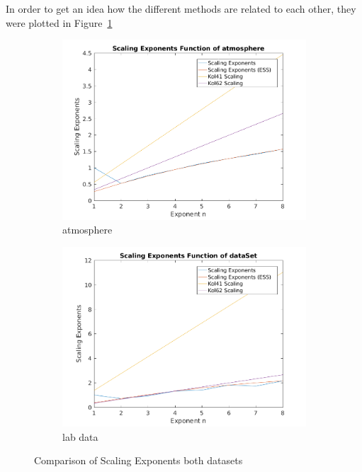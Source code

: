 \documentclass[12pt]{article}
\begin{document}
In order to get an idea how the different methods are related to each other, they were plotted in Figure~\ref{fig:comparison_ess}
\begin{figure}[H]
\begin{subfigure}{0.5\textwidth}
  \centering
  \includegraphics[width=1\linewidth]{figures/scale_compare_atmo.png}
  \caption{atmosphere}
\end{subfigure}
\begin{subfigure}{0.5\textwidth}
  \centering
  \includegraphics[width=1\linewidth]{figures/scale_compare_center.png}
  \caption{lab data}
\end{subfigure}
\caption{Comparison of Scaling Exponents both datasets}
\label{fig:comparison_ess}
\end{figure}
\end{document}
